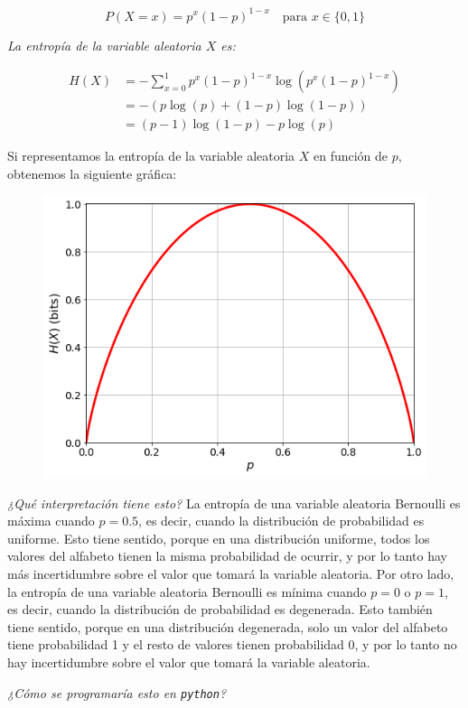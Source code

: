 \[
P(X=x) = p^x(1-p)^{1-x} \quad \text{para } x\in\{0,1\}
\]

\emph{La entropía de la variable aleatoria \(X\) es:}


\begin{align*}
H(X) &= -\sum_{x=0}^1 p^x(1-p)^{1-x}\log\left(p^x(1-p)^{1-x}\right) \\
&= -\left(p\log(p) + (1-p)\log(1-p)\right) \\
&= (p-1)\log(1-p) -p\log(p)
\end{align*}

Si representamos la entropía de la variable aleatoria \(X\) en función
de \(p\), obtenemos la siguiente gráfica:

\begin{figure}[htbp!]
\centering
\includegraphics[width=0.65\linewidth]{./img/bernoulli_entropy.png}
\end{figure}

\emph{¿Qué interpretación tiene esto?} La entropía de una variable
aleatoria Bernoulli es máxima cuando \(p=0.5\), es decir, cuando la
distribución de probabilidad es uniforme. Esto tiene sentido, porque en
una distribución uniforme, todos los valores del alfabeto tienen la
misma probabilidad de ocurrir, y por lo tanto hay más incertidumbre
sobre el valor que tomará la variable aleatoria. Por otro lado, la
entropía de una variable aleatoria Bernoulli es mínima cuando \(p=0\) o
\(p=1\), es decir, cuando la distribución de probabilidad es degenerada.
Esto también tiene sentido, porque en una distribución degenerada, solo
un valor del alfabeto tiene probabilidad 1 y el resto de valores tienen
probabilidad 0, y por lo tanto no hay incertidumbre sobre el valor que
tomará la variable aleatoria.

\emph{¿Cómo se programaría esto en \texttt{python}?}

